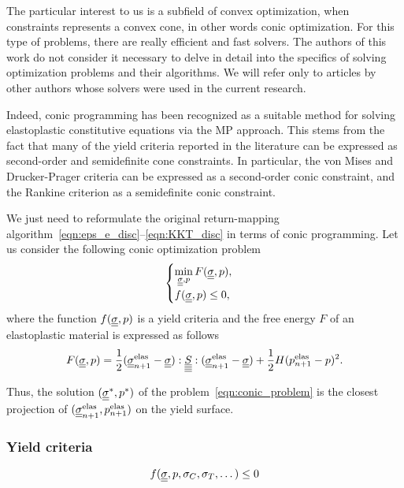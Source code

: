 \documentclass[12pt]{article}
\newcommand{\todounderline}[1]{\todo[inline, size=\scriptsize]{#1}}
\begin{document}
The particular interest to us is a subfield of convex optimization, when constraints represents a convex cone, in other words conic optimization. For this type of problems, there are really efficient and fast solvers. The authors of this work do not consider it necessary to delve in detail into the specifics of solving optimization problems and their algorithms. We will refer only to articles by other authors whose solvers were used in the current research.

Indeed, conic programming has been recognized as a suitable method for solving elastoplastic constitutive equations via the MP approach. This stems from the fact that many of the yield criteria reported in the literature can be expressed as second-order and semidefinite cone constraints. In particular, the von Mises and Drucker-Prager criteria can be expressed as a second-order conic constraint, and the Rankine criterion as a semidefinite conic constraint. 

We just need to reformulate the original return-mapping algorithm~\ref{eqn:eps_e_disc}--\ref{eqn:KKT_disc} in terms of conic programming. Let us consider the following conic optimization problem
\begin{equation}
    \label{eqn:conic_problem}
    \begin{cases}
        \min\limits_{\underline{\underline{\sigma}}, p} F(\underline{\underline{\sigma}}, p), \\
        f(\underline{\underline{\sigma}}, p) \leq 0,
    \end{cases}
\end{equation}
where the function $f(\underline{\underline{\sigma}}, p)$ is a yield criteria and the free energy $F$ of an elastoplastic material is expressed as follows
\begin{equation}
    F(\underline{\underline{\sigma}}, p) = \frac{1}{2}(\underline{\underline{\sigma}}_{n+1}^{\text{elas}} - \underline{\underline{\sigma}}) : \underline{\underline{\underline{\underline{S}}}} : (\underline{\underline{\sigma}}_{n+1}^{\text{elas}} - \underline{\underline{\sigma}}) + \frac{1}{2}H(p_{n+1}^\text{elas} - p)^2.
\end{equation}

Thus, the solution $(\underline{\underline{\sigma}}^*, p^*)$ of the problem~\ref{eqn:conic_problem} is the closest projection of $(\underline{\underline{\sigma}}_{n+1}^{\text{elas}}, p_{n+1}^\text{elas})$ on the yield surface.

\subsubsection{Yield criteria}

\todounderline{Describe every yield criterion}

\begin{equation}
    f(\underline{\underline{\sigma}}, p, \sigma_C, \sigma_T, \dots) \leq 0
\end{equation}
\end{document}
